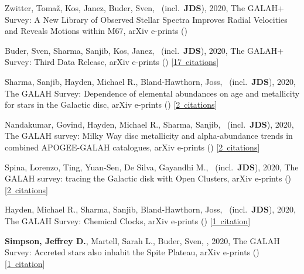 \item[{\color{numcolor}\scriptsize13}] Zwitter, Toma{\v{z}}, Kos, Janez, Buder, Sven, \etal\ (incl.\ \textbf{JDS}), 2020, The GALAH+ Survey: A New Library of Observed Stellar Spectra Improves Radial Velocities and Reveals Motions within M67, arXiv e-prints ()

\item[{\color{numcolor}\scriptsize12}] Buder, Sven, Sharma, Sanjib, Kos, Janez, \etal\ (incl.\ \textbf{JDS}), 2020, The GALAH+ Survey: Third Data Release, arXiv e-prints () [\href{https://ui.adsabs.harvard.edu/#abs/2020arXiv201102505B}{17~citations}]

\item[{\color{numcolor}\scriptsize11}] Sharma, Sanjib, Hayden, Michael R., Bland-Hawthorn, Joss, \etal\ (incl.\ \textbf{JDS}), 2020, The GALAH Survey: Dependence of elemental abundances on age and metallicity for stars in the Galactic disc, arXiv e-prints () [\href{https://ui.adsabs.harvard.edu/#abs/2020arXiv201113818S}{2~citations}]

\item[{\color{numcolor}\scriptsize10}] Nandakumar, Govind, Hayden, Michael R., Sharma, Sanjib, \etal\ (incl.\ \textbf{JDS}), 2020, The GALAH survey: Milky Way disc metallicity and alpha-abundance trends in combined APOGEE-GALAH catalogues, arXiv e-prints () [\href{https://ui.adsabs.harvard.edu/#abs/2020arXiv201102783N}{2~citations}]

\item[{\color{numcolor}\scriptsize9}] Spina, Lorenzo, Ting, Yuan-Sen, De Silva, Gayandhi M., \etal\ (incl.\ \textbf{JDS}), 2020, The GALAH survey: tracing the Galactic disk with Open Clusters, arXiv e-prints () [\href{https://ui.adsabs.harvard.edu/#abs/2020arXiv201102533S}{2~citations}]

\item[{\color{numcolor}\scriptsize8}] Hayden, Michael R., Sharma, Sanjib, Bland-Hawthorn, Joss, \etal\ (incl.\ \textbf{JDS}), 2020, The GALAH Survey: Chemical Clocks, arXiv e-prints () [\href{https://ui.adsabs.harvard.edu/#abs/2020arXiv201113745H}{1~citation}]

\item[{\color{numcolor}\scriptsize7}] \textbf{Simpson, Jeffrey D.}, Martell, Sarah L., Buder, Sven, \etal, 2020, The GALAH Survey: Accreted stars also inhabit the Spite Plateau, arXiv e-prints () [\href{https://ui.adsabs.harvard.edu/#abs/2020arXiv201102659S}{1~citation}]

